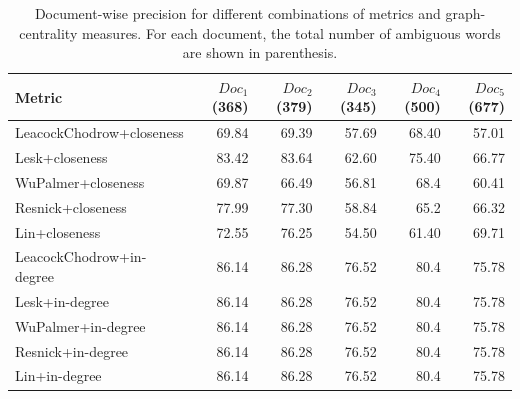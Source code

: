 \documentclass[12pt,letterpaper]{article}
\begin{document}
\begin{table}[H]
\begin{tabular}{|l|r|r|r|r|r|}
Metric & $Doc_1$ (368) & $Doc_2$ (379) & $Doc_3$ (345) & $Doc_4$ (500) & $Doc_5$ (677) \\
\hline
LeacockChodrow+closeness & 69.84 & 69.39 & 57.69 & 68.40 & 57.01 \\
Lesk+closeness & 83.42 & 83.64 & 62.60 & 75.40 & 66.77 \\
WuPalmer+closeness & 69.87 & 66.49 & 56.81 & 68.4 & 60.41 \\
Resnick+closeness & 77.99 & 77.30 & 58.84 & 65.2 & 66.32 \\
Lin+closeness & 72.55 & 76.25 & 54.50 & 61.40 & 69.71 \\
LeacockChodrow+in-degree & 86.14 & 86.28 & 76.52 & 80.4 & 75.78 \\
Lesk+in-degree & 86.14 & 86.28 & 76.52 & 80.4 & 75.78 \\
WuPalmer+in-degree & 86.14 & 86.28 & 76.52 & 80.4 & 75.78 \\
Resnick+in-degree & 86.14 & 86.28 & 76.52 & 80.4 & 75.78 \\
Lin+in-degree & 86.14 & 86.28 & 76.52 & 80.4 & 75.78 \\
\end{tabular}
\caption{Document-wise precision for different combinations of metrics and graph-centrality measures. For each document, the total number of ambiguous words are shown in parenthesis.}
\label{table:3}
\end{table}
\end{document}
